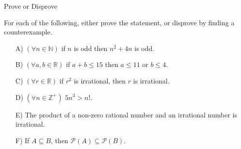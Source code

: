 \begin{homeworkProblem}{Prove or Disprove}

For each of the following, either prove the statement, or disprove by finding a counterexample.

\begin{enumerate}
    \item[A)] $(\forall n \in \mathbb{N})$ if $n$ is odd then $n^2 + 4n$ is odd.
    \item[B)] $(\forall a, b \in \mathbb{R})$ if $a + b \leq 15$ then $a \leq 11$ or $b \leq 4$.
    \item[C)] $(\forall r \in \mathbb{R})$ if $r^2$ is irrational, then $r$ is irrational.
    \item[D)] $(\forall n \in \mathbb{Z}^+)$ $5n^3 > n!$. 
    \item[E)] The product of a non-zero rational number and an irrational number is irrational.
    \item[F)] If $A \subseteq B$, then $\mathscr{P}(A) \subseteq \mathscr{P}(B)$.  
\end{enumerate}


\end{homeworkProblem}
